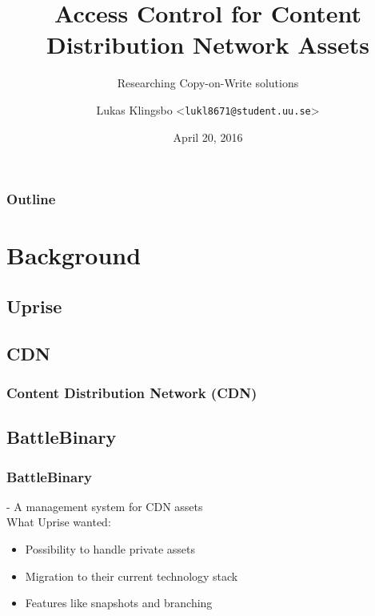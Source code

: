 \documentclass{beamer}
\title{Access Control for Content Distribution Network Assets}
\subtitle{Researching Copy-on-Write solutions}
\author[Lukas Klingsbo | \emph{lukl8671@student.uu.se}] %
{Lukas Klingsbo <\texttt{lukl8671@student.uu.se}>}
\institute[Dept.\ of Information Technology]%
{Department of Information Technology\\Uppsala University}
\date[]
{April 20, 2016}
\begin{document}
\begin{frame}[plain] %
  \titlepage
\end{frame}

\begin{frame}
    \frametitle{Outline}
    \setcounter{tocdepth}{2}
    \tableofcontents[]
\end{frame}

\section{Background}

\subsection{Uprise}
\begin{frame}
  \frametitle{}
  \centerline{}
  \vspace{30pt}
  \centerline{}
  \vspace{10pt}
  \centerline{}
  \vspace{10pt}
  \centerline{}
\end{frame}

\subsection{CDN}
\begin{frame}
  \frametitle{Content Distribution Network (CDN)}
  \centerline{}
\end{frame}

\subsection{BattleBinary}
\begin{frame}
  \frametitle{BattleBinary}
  - A management system for CDN assets\\
  \vspace{1em}
  What Uprise wanted:
  \begin{itemize}
    \item{Possibility to handle private assets}
    \item{Migration to their current technology stack}
    \item{Features like snapshots and branching}
  \end{itemize}
\end{frame}
\end{document}
